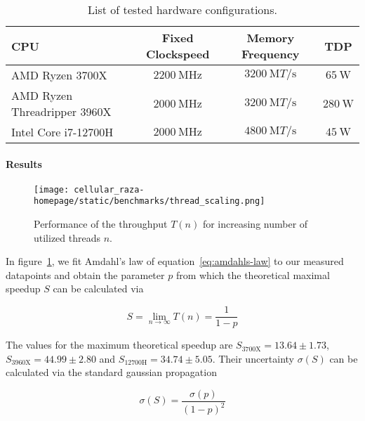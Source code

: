 \begin{table}
    \centering
    \begin{tabular}{l c c c}
        CPU & Fixed Clockspeed & Memory Frequency & TDP\\
        \hline
        AMD Ryzen 3700X~\cite{AMDProductSpecifications} & $\SI{2200}{\mega\hertz}$
            & $\SI{3200}{\mega T\per\second}$ & $\SI{65}{\watt}$\\
        AMD Ryzen Threadripper 3960X~\cite{AMDProductSpecifications} & $\SI{2000}{\mega\hertz}$
            & $\SI{3200}{\mega T\per\second}$ & $\SI{280}{\watt}$\\
        Intel Core i7-12700H~\cite{Inteli712700H} & $\SI{2000}{\mega\hertz}$
            & $\SI{4800}{\mega T\per\second}$
            & $\SI{45}{\watt}$\\
    \end{tabular}
    \caption{List of tested hardware configurations.}
    \label{tab:hardware-configurations}
\end{table}

\paragraph{Results}

\begin{figure}[H]
    \centering
    \texttt{[image: cellular\_raza-homepage/static/benchmarks/thread\_scaling.png]}
    \caption[Throughput performance of the cell-sorting example]
    {Performance of the throughput $T(n)$ for increasing number of utilized threads $n$.}
    \label{fig:amdahls-law-fit}
\end{figure}

In figure~\ref{fig:amdahls-law-fit}, we fit Amdahl's law of equation~\ref{eq:amdahls-law} to our
measured datapoints and obtain the parameter $p$ from which the theoretical maximal speedup $S$ can
be calculated via

\begin{equation}
    S = \lim\limits_{n\rightarrow\infty} T(n) = \frac{1}{1-p}
    \label{eq:amdahls-law-maximum-speedup}
\end{equation}

The values for the maximum theoretical speedup are $S_\text{3700X}=13.64\pm1.73$,
$S_\text{3960X}=44.99\pm2.80$ and $S_\text{12700H}=34.74\pm5.05$.
Their uncertainty $\sigma(S)$ can be calculated via the standard gaussian propagation

\begin{equation}
    \sigma(S) = \frac{\sigma(p)}{(1-p)^2}
\end{equation}

